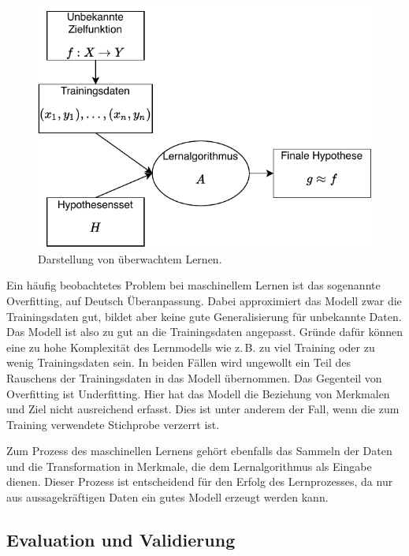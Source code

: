 	\begin{figure}[H]
		\centering
		\includegraphics{pic/SupervisedLearning.pdf}
		\caption{Darstellung von überwachtem Lernen.}
		\label{fig:supervisedLearning}
	\end{figure}

	
	Ein häufig beobachtetes Problem bei maschinellem Lernen ist das sogenannte Overfitting, auf Deutsch Überanpassung. Dabei approximiert das Modell zwar die Trainingsdaten gut, bildet aber keine gute Generalisierung für unbekannte Daten. Das Modell ist also zu gut an die Trainingsdaten angepasst. Gründe dafür können eine zu hohe Komplexität des Lernmodells wie z.\,B. zu viel Training oder zu wenig Trainingsdaten sein. %
	In beiden Fällen wird ungewollt ein Teil des Rauschens %
	der Trainingsdaten in das Modell übernommen. Das Gegenteil von Overfitting ist Underfitting. Hier hat das Modell die Beziehung von Merkmalen und Ziel nicht ausreichend erfasst. Dies ist unter anderem der Fall, wenn die zum Training verwendete Stichprobe verzerrt ist.
	
	Zum Prozess des maschinellen Lernens gehört ebenfalls das Sammeln der Daten und die Transformation in Merkmale, die dem Lernalgorithmus als Eingabe dienen. Dieser Prozess ist entscheidend für den Erfolg des Lernprozesses, da nur aus aussagekräftigen Daten ein gutes Modell erzeugt werden kann.

	\subsection{Evaluation und Validierung}
	
